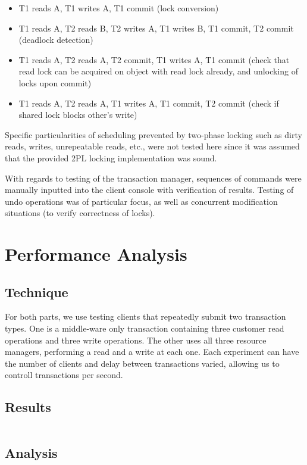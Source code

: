 \documentclass[11pt]{article}
\begin{document}
\begin{itemize}
\item T1 reads A, T1 writes A, T1 commit (lock conversion)
\item T1 reads A, T2 reads B, T2 writes A, T1 writes B, T1 commit, T2 commit (deadlock detection)
\item T1 reads A, T2 reads A, T2 commit, T1 writes A, T1 commit (check that read lock can be acquired on object with read lock already, and unlocking of locks upon commit)
\item T1 reads A, T2 reads A, T1 writes A, T1 commit, T2 commit (check if shared lock blocks other's write)
\end{itemize}

Specific particularities of scheduling prevented by two-phase locking such as dirty reads, writes, unrepeatable reads, etc., were not tested here since it was assumed that the provided 2PL locking implementation was sound. \par

With regards to testing of the transaction manager, sequences of commands were manually inputted into the client console with verification of results. Testing of undo operations was of particular focus, as well as concurrent modification situations (to verify correctness of locks).\par

\section*{Performance Analysis}

\subsection*{Technique}

For both parts, we use testing clients that repeatedly submit two transaction types. One is a middle-ware only transaction containing three customer read operations and three write operations. The other uses all three resource managers, performing a read and a write at each one. Each experiment can have the number of clients and delay between transactions varied, allowing us to controll transactions per second.

\subsection*{Results}

\begin{tabular}{cc}

\end{tabular}

\subsection*{Analysis}
\end{document}
